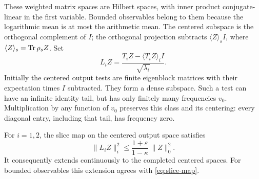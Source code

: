 These weighted matrix spaces are Hilbert spaces, with inner product
conjugate-linear in the first variable. Bounded observables belong to
them because the logarithmic mean is at most the arithmetic mean.
The centered subspace is the orthogonal complement of $I$; the
orthogonal projection subtracts
$\langle Z\rangle_sI$, where $\langle Z\rangle_s=\operatorname{Tr}\rho_sZ$.
Set
\begin{equation}\label{eq:slice-map}
 L_iZ=\frac{T_iZ-\langle T_iZ\rangle_i I}{\sqrt{\lambda_i}}.
\end{equation}
Initially the centered output tests are finite eigenblock matrices
with their expectation times $I$ subtracted. They form a dense
subspace. Such a test can have an infinite identity tail, but has
only finitely many frequencies $v_0$. Multiplication by any function
of $v_0$ preserves this class and its centering: every diagonal
entry, including that tail, has frequency zero.

\begin{proposition}\label{prop:hessian}
For $i=1,2$, the slice map on the centered output space satisfies
\begin{equation}\label{eq:hessian}
 \|L_iZ\|_i^2
 \le\frac{1+\varepsilon}{1-\kappa}\,\|Z\|_0^2.
\end{equation}
It consequently extends continuously to the completed centered
spaces. For bounded observables this extension agrees with
\eqref{eq:slice-map}.
\end{proposition}

